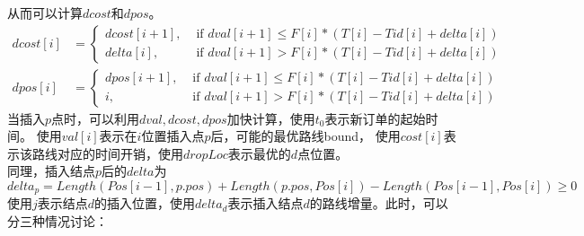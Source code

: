 \documentclass[hyperref,UTF8]{ctexart}
\theoremstyle{definition}
\theoremstyle{remark}
\numberwithin{equation}{subsection}
\begin{document}
从而可以计算$dcost$和$dpos$。
\begin{align*}
	dcost[i] &= \left\{
		\begin{aligned}
			dcost[i+1], &\text{ if } dval[i+1] \le F[i]*(T[i]-Tid[i]+delta[i]) \\
			delta[i], &\text{ if }	dval[i+1] > F[i]*(T[i]-Tid[i]+delta[i])
		\end{aligned}
	\right . \\
	dpos[i] &= \left\{
		\begin{aligned}
			dpos[i+1], &\text{ if } dval[i+1] \le F[i]*(T[i]-Tid[i]+delta[i]) \\
			i, &\text{ if }	dval[i+1] > F[i]*(T[i]-Tid[i]+delta[i])
		\end{aligned}
	\right .
\end{align*}
当插入$p$点时，可以利用$dval, dcost, dpos$加快计算，使用$t_0$表示新订单的起始时间。
使用$val[i]$表示在$i$位置插入点$p$后，可能的最优路线bound，
使用$cost[i]$表示该路线对应的时间开销，使用$dropLoc$表示最优的$d$点位置。\\
同理，插入结点$p$后的$delta$为
\[
	delta_p = Length(Pos[i-1], p.pos) + Length(p.pos, Pos[i]) - Length(Pos[i-1], Pos[i]) \ge 0
\]
使用$j$表示结点$d$的插入位置，使用$delta_d$表示插入结点$d$的路线增量。此时，可以分三种情况讨论：
\end{document}
